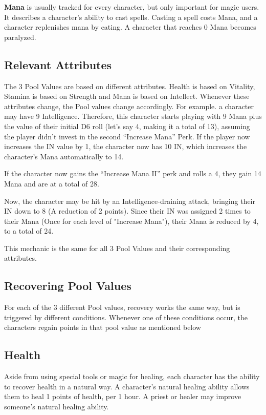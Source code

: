 \textbf{Mana} is usually tracked for every character, but only important for magic users. It describes a character’s ability to cast spells. Casting a spell costs Mana, and a character replenishes mana by eating. A character that reaches 0 Mana becomes paralyzed.


\subsection{Relevant Attributes}

The 3 Pool Values are based on different attributes. Health is based on Vitality, Stamina is based on Strength and Mana is based on Intellect. Whenever these attributes change, the Pool values change accordingly. For example. a character may have 9 Intelligence. Therefore, this character starts playing with 9 Mana plus the value of their initial D6 roll (let's say 4, making it a total of 13), assuming the player didn’t invest in the second “Increase Mana” Perk. If the player now increases the IN value by 1, the character now has 10 IN, which increases the character’s Mana automatically to 14.

If the character now gains the “Increase Mana II” perk and rolls a 4, they gain 14 Mana and are at a total of 28.

Now, the character may be hit by an Intelligence-draining attack, bringing their IN down to 8 (A reduction of 2 points). Since their IN was assigned 2 times to their Mana (Once for each level of "Increase Mana"), their Mana is reduced by 4, to a total of 24.


This mechanic is the same for all 3 Pool Values and their corresponding attributes.


\subsection{Recovering Pool Values}

For each of the 3 different Pool values, recovery works the same way, but is triggered by different conditions. Whenever one of these conditions occur, the characters regain points in that pool value as mentioned below


\subsection{Health}

Aside from using special tools or magic for healing, each character has the ability to recover health in a natural way. A character's natural healing ability allows them to heal 1 points of health, per 1 hour.
A priest or healer may improve someone's natural healing ability.


